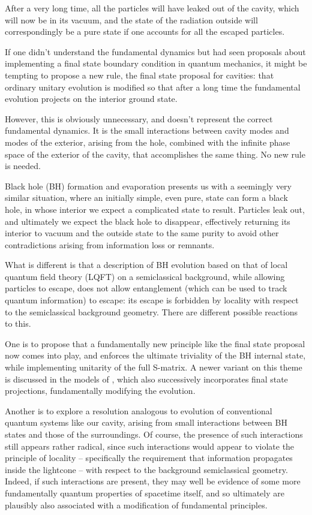 \documentclass[12pt]{article}
\numberwithin{equation}{section}
\begin{document}
After a very long time, all the particles will have leaked out of the cavity, which will now be in its vacuum, and the state of the radiation outside will correspondingly be a pure state if one accounts for all the escaped particles.  

If one didn't understand the fundamental dynamics but had seen proposals about implementing a final state boundary condition in quantum mechanics\cite{ABL,Griffiths:1984rx,Gell-Mann:1991kdm},
it might be tempting to propose a new rule,  the final state proposal for cavities: that ordinary unitary evolution is modified so that after a long time the fundamental evolution  projects on the interior ground state.  

However, this is obviously unnecessary, and doesn't represent the correct fundamental dynamics. It is the small interactions between cavity modes and modes of the exterior, arising from the hole, combined with the infinite phase space of the exterior of the cavity, that accomplishes the same thing.  No new rule is needed.

Black hole (BH) formation and evaporation presents us with a seemingly very similar situation, where an initially simple, even pure, state can form a black hole, in whose interior we expect a complicated state to result.  Particles leak out, and ultimately we expect the black hole to disappear, effectively returning its interior to vacuum and the outside state to the same purity to avoid other contradictions arising from information loss\cite{Hawk-incoh,BPS} or remnants\cite{CaWi,Pres,WABHIP,Susstrouble}.  

What is different is that a description of BH evolution based on that of local quantum field theory (LQFT) on a semiclassical background, while allowing particles to escape\cite{Hawk}, does not allow entanglement (which can be used to track quantum information) to escape: its escape is forbidden by locality with respect to the semiclassical background geometry.  There are different possible reactions to this.

One is to propose that a fundamentally new principle like  the final state proposal\cite{ABL,Griffiths:1984rx,Gell-Mann:1991kdm} now comes into play\cite{HoMa}, and enforces the ultimate triviality of the BH internal state, while implementing unitarity of the full S-matrix.  A newer variant on this theme is discussed in the models of \cite{AEHPV}, which also successively incorporates final state projections, fundamentally modifying the evolution.

Another is to explore a resolution  analogous to evolution of conventional quantum systems like our cavity, arising from small interactions between BH states and those of the surroundings.  Of course, the presence of such interactions still appears rather radical, since such interactions would appear to violate the principle of locality -- specifically the requirement that information propagates inside the lightcone -- with respect to the background semiclassical geometry.  Indeed, if such interactions are present, they may well be evidence of some more fundamentally quantum properties of spacetime itself, and so ultimately are plausibly also associated with a modification of fundamental principles.
\end{document}
